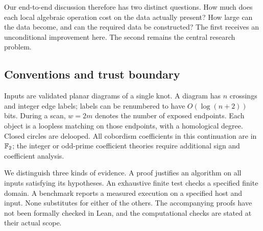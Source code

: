 Our end-to-end discussion therefore has two distinct questions. How much
does each local algebraic operation cost on the data actually present?
How large can the data become, and can the required data be constructed?
The first receives an unconditional improvement here. The second remains
the central research problem.

\subsection{Conventions and trust boundary}

Inputs are validated planar diagrams of a single knot. A diagram has $n$
crossings and integer edge labels; labels can be renumbered to have
$O(\log(n+2))$ bits. During a scan, $w=2m$ denotes the number of exposed
endpoints. Each object is a loopless matching on those endpoints, with a
homological degree. Closed circles are delooped. All cobordism
coefficients in this continuation are in $\mathbb F_2$; the integer or odd-prime
coefficient theories require additional sign and coefficient analysis.

We distinguish three kinds of evidence. A proof justifies an algorithm on
all inputs satisfying its hypotheses. An exhaustive finite test checks a
specified finite domain. A benchmark reports a measured execution on a
specified host and input. None substitutes for either of the others.
The accompanying proofs have not been formally checked in Lean, and the
computational checks are stated at their actual scope.
